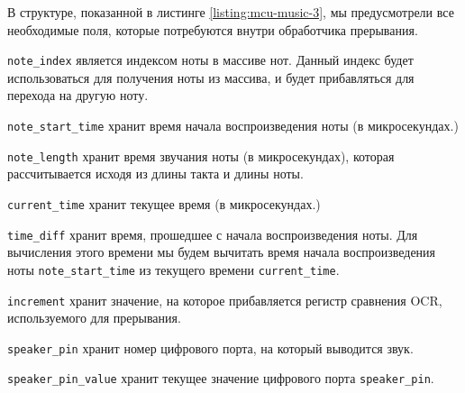 \documentclass[../sparc.tex]{subfiles}
\begin{document}
В структуре, показанной в листинге \ref{listing:mcu-music-3}, мы предусмотрели
все необходимые поля, которые потребуются внутри обработчика прерывания.

\texttt{note_index} является индексом ноты в массиве нот.  Данный
индекс будет использоваться для получения ноты из массива, и будет прибавляться
для перехода на другую ноту.

\texttt{note_start_time} хранит время начала воспроизведения ноты (в
микросекундах.)

\texttt{note_length} хранит время звучания ноты (в микросекундах),
которая рассчитывается исходя из длины такта и длины ноты.

\texttt{current_time} хранит текущее время (в микросекундах.)

\texttt{time_diff} хранит время, прошедшее с начала воспроизведения
ноты.  Для вычисления этого времени мы будем вычитать время начала
воспроизведения ноты \texttt{note_start_time} из текущего времени
\texttt{current_time}.

\texttt{increment} хранит значение, на которое прибавляется регистр
сравнения OCR, используемого для прерывания.

\texttt{speaker_pin} хранит номер цифрового порта, на который выводится
звук.

\texttt{speaker_pin_value} хранит текущее значение цифрового порта
\texttt{speaker_pin}.
\end{document}

